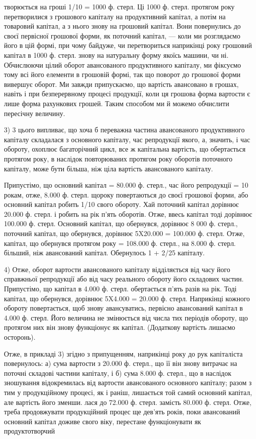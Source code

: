 \parcont{}  %
творюється на гроші 1/10 = 1000 ф. стерл. Ці 1000 ф. стерл. протягом року
перетворилися з грошового капіталу на продуктивний капітал, а потім на
товаровий капітал, а з нього знову на грошовий капітал. Вони повернулись
до своєї первісної грошової форми, як поточний капітал, — коли ми
розглядаємо його в цій формі, при чому байдуже, чи перетвориться наприкінці
року грошовий капітал в 1000 ф. стерл. знову на натуральну
форму якоїсь машини, чи ні. Обчислюючи цілий оборот авансованого продуктивного
капіталу, ми фіксуємо тому всі його елементи в грошовій формі,
так що поворот до грошової форми вивершує оборот. Ми завжди припускаємо,
що вартість авансовано в грошах, навіть і при безперервному
процесі продукції, коли ця грошова форма вартости є лише форма
рахункових грошей. Таким способом ми й можемо обчислити пересічну
величину.

3) 3 цього випливає, що хоча б переважна частина авансованого
продуктивного капіталу складалася з основного капіталу, час репродукції
якого, а, значить, і час обороту, охоплює багаторічний цикл, все ж капітальна
вартість, що обертається протягом року, в наслідок повторюваних
протягом року оборотів поточного капіталу, може бути більша, ніж ціла
вартість авансованого капіталу.

Припустімо, що основний капітал = 80.000 ф. стерл., час його репродукції
= 10 рокам, отже, 8.000 ф. стерл. щороку повертаються до своєї
грошової форми, або основний капітал робить 1/10 свого обороту. Хай
поточний капітал дорівнює 20.000 ф. стерл. і робить на рік п’ять оборотів.
Отже, ввесь капітал тоді дорівнює 100.000 ф. стерл. Основний
капітал, що обернувся, дорівнює 8 000 ф. стерл., поточний капітал, що
обернувся, дорівнює 5X20.000 = 100.000 ф. стерл. Отже, капітал, що
обернувся протягом року = 108.000 ф. стерл., на 8.000 ф. стерл. більший,
ніж авансований капітал. Обернулось 1 + 2/25 капіталу.

4) Отже, оборот вартости авансованого капіталу відділяється
від часу його справжньої репродукції або від часу реального обороту
його складових частин. Припустімо, що капітал в 4.000 ф. стерл. обертається
п’ять разів на рік. Тоді капітал, що обернувся, дорівнює
5X4.000 = 20.000 ф. стерл. Наприкінці кожного обороту повертається,
щоб знову авансуватись, первісно авансований капітал в 4.000 ф. стерл.
Його величина не змінюється від числа тих періодів обороту, що
протягом них він знову функціонує як капітал. (Додаткову вартість
лишаємо осторонь).

Отже, в прикладі 3) згідно з припущенням, наприкінці року до рук
капіталіста повернулось: а) сума вартости з 20.000 ф. стерл., що її він
знову витрачає на поточні складові частини капіталу, і б) сума 8.000 ф.
стерл., що в наслідок зношування відокремилась від вартости авансованого
основного капіталу; разом з тим у продукційному процесі, як і
раніш, лишається той самий основний капітал, але вартість його зменши.
лася до 72.000 ф. стерл. замість 80.000 ф. стерл. Отже, треба продовжувати
продукційний процес ще дев’ять років, поки авансований основний
капітал доживе свого віку, перестане функціонувати як продуктотворчий
\parbreak{}  %

